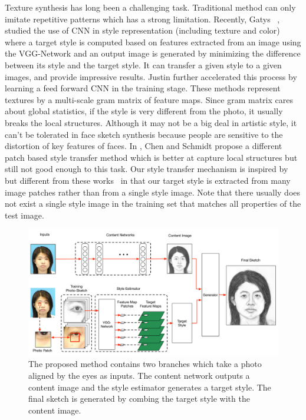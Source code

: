 \documentclass[10pt,twocolumn,letterpaper]{article}
\begin{document}
Texture synthesis has long been a challenging task. Traditional method can only imitate repetitive patterns which has a strong limitation. Recently, Gatys \etal ~\cite{gatys2015texture,gatys2015neural}, studied the use of CNN in style representation (including texture and color) where a target style is computed based on features extracted from an image using the VGG-Network and an output image is generated by minimizing the difference between its style and the target style. It can transfer a given style to a given images, and provide impressive results. Justin \etal \cite{feifei2016} further accelerated this process by learning a feed forward CNN in the training stage. These methods represent textures by a multi-scale gram matrix of feature maps. Since gram matrix cares about global statistics, if the style is very different from the photo, it usually breaks the local structures. Although it may not be a big deal in artistic style, it can't be tolerated in face sketch synthesis because people are sensitive to the distortion of key features of faces. In \cite{Chen2016Patch}, Chen and Schmidt propose a different patch based style transfer method which is better at capture local structures but still not good enough to this task. Our style transfer mechanism is inspired by but different from these works~\cite{gatys2015texture,gatys2015neural,feifei2016} in that our target style is extracted from many image patches rather than from a single style image. Note that there usually does not exist a single style image in the training set that matches all properties of the test image. 

\begin{figure}[t]
\centering
\includegraphics[width=0.85\linewidth]{img/overview.pdf}
\caption{The proposed method contains two branches which take a photo aligned by the eyes as inputs. The content network outputs a content image and the style estimator generates a target style. The final sketch is generated by combing the target style with the content image.}
\label{fig:overview}
\end{figure}
\end{document}
